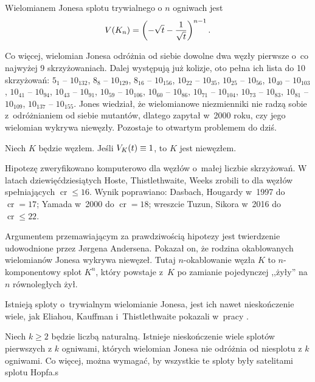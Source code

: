 \begin{proposition}
\label{prp:jones_trivial_link}
    Wielomianem Jonesa splotu trywialnego o $n$ ogniwach jest
    \begin{equation}
        V(K_n) = \left(-\sqrt{t} - \frac{1}{\sqrt {t}}\right)^{n-1}.
    \end{equation}
\end{proposition}

Co więcej, wielomian Jonesa odróżnia od siebie dowolne dwa węzły pierwsze o~co najwyżej 9 skrzyżowaniach.
Dalej występują już kolizje, oto pełna ich lista do 10 skrzyżowań:
$5_{1}$ -- $10_{132}$,
$8_{8}$ -- $10_{129}$,
$8_{16}$ -- $10_{156}$,
$10_{22}$ -- $10_{35}$,
$10_{25}$ -- $10_{56}$,
$10_{40}$ -- $10_{103}$,
$10_{41}$ -- $10_{94}$,
$10_{43}$ -- $10_{91}$,
$10_{59}$ -- $10_{106}$,
$10_{60}$ -- $10_{86}$,
$10_{71}$ -- $10_{104}$,
$10_{73}$ -- $10_{83}$,
$10_{81}$ -- $10_{109}$,
$10_{137}$ -- $10_{155}$.
Jones wiedział, że wielomianowe niezmienniki nie radzą sobie z~odróżnianiem od siebie mutantów, dlatego zapytał w~2000 roku, czy jego wielomian wykrywa niewęzły.
Pozostaje to otwartym problemem do dziś.

\begin{conjecture} \label{jones_conjecture}
    Niech $K$ będzie węzłem.
    Jeśli $V_K(t) \equiv 1$, to $K$ jest niewęzłem.
\end{conjecture}

Hipotezę zweryfikowano komputerowo dla węzłów o~małej liczbie skrzyżowań.
W latach dziewięćdziesiątych Hoste, Thistlethwaite, Weeks zrobili to dla węzłów spełniających $\operatorname{cr} \le 16$.
Wynik poprawiano: Dasbach, Hougardy w~1997 do $\operatorname{cr} = 17$; Yamada w~2000 do $\operatorname{cr} = 18$; wreszcie Tuzun, Sikora w~2016 do $\operatorname{cr} \le 22$.

Argumentem przemawiającym za prawdziwością hipotezy jest twierdzenie udowodnione przez Jørgena Andersena.
Pokazał on, że rodzina okablowanych wielomianów Jonesa wykrywa niewęzeł.
Tutaj $n$-okablowanie węzła $K$ to $n$-komponentowy splot $K^n$, który powstaje z~$K$ po zamianie pojedynczej ,,żyły'' na $n$ równoległych żył.

Istnieją sploty o~trywialnym wielomianie Jonesa, jest ich nawet nieskończenie wiele, jak Eliahou, Kauffman i~Thistlethwaite pokazali w~pracy \cite{eliahou03}.

\begin{proposition}
    Niech $k \ge 2$ będzie liczbą naturalną.
    Istnieje nieskończenie wiele splotów pierwszych z $k$ ogniwami, których wielomian Jonesa nie odróżnia od niesplotu z $k$ ogniwami.
    Co więcej, można wymagać, by wszystkie te sploty były satelitami splotu Hopfa.s
\end{proposition}

